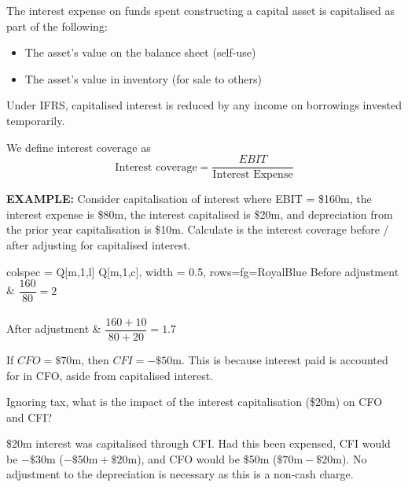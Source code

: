 \documentclass[../notes_compiled.tex]{subfiles}
\begin{document}
\begin{itemize}
\item The interest expense on funds spent constructing a capital asset is capitalised as part of the following:
\begin{itemize}
\item The asset's value on the balance sheet (self-use)
\item The asset's value in inventory (for sale to others)
\end{itemize}
Under IFRS, capitalised interest is reduced by any income on borrowings invested temporarily.

\item We define interest coverage as
\begin{equation}
\text{Interest coverage} = \frac{EBIT}{\text{Interest Expense}}
\end{equation}

{\color{RedViolet}
\item[] \textbf{EXAMPLE:} Consider capitalisation of interest where EBIT = \$160m, the interest expense is \$80m, the interest capitalised is \$20m, and depreciation from the prior year capitalisation is \$10m. Calculate is the interest coverage before / after adjusting for capitalised interest.
}
{\color{RoyalBlue}
\begin{table}[h!]
\centering
\begin{tblr}{colspec = {Q[m,1,l] Q[m,1,c]}, width = 0.5\textwidth, rows={fg=RoyalBlue}}
Before adjustment & $\dfrac{160}{80}=2$ \\ \\
After adjustment & $\dfrac{160+10}{80+20} = 1.7$
\end{tblr}
\end{table}

If $CFO=\$70$m, then $CFI = -\$50$m. This is because interest paid is accounted for in CFO, aside from capitalised interest.
}

{\color{RedViolet}
Ignoring tax, what is the impact of the interest capitalisation (\$20m) on CFO and CFI?
}

{\color{RoyalBlue}
\$20m interest was capitalised through CFI. Had this been expensed, CFI would be $-\$30$m ($-\$50\mathrm{m} + \$20\mathrm{m}$), and CFO would be \$50m ($\$70\mathrm{m} - \$20\mathrm{m}$). No adjustment to the depreciation is necessary as this is a non-cash charge.
}
\end{itemize}
\end{document}
